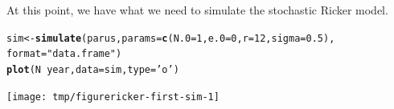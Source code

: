 \documentclass{beamer}\usepackage[]{graphicx}\usepackage[]{color}
\makeatletter
\newcommand{\hlnum}[1]{\textcolor[rgb]{0.686,0.059,0.569}{#1}}%
\newcommand{\hlstr}[1]{\textcolor[rgb]{0.192,0.494,0.8}{#1}}%
\newcommand{\hlopt}[1]{\textcolor[rgb]{0,0,0}{#1}}%
\newcommand{\hlstd}[1]{\textcolor[rgb]{0.345,0.345,0.345}{#1}}%
\newcommand{\hlkwb}[1]{\textcolor[rgb]{0.69,0.353,0.396}{#1}}%
\newcommand{\hlkwc}[1]{\textcolor[rgb]{0.333,0.667,0.333}{#1}}%
\newcommand{\hlkwd}[1]{\textcolor[rgb]{0.737,0.353,0.396}{\textbf{#1}}}%
\newenvironment{kframe}{%
 \def\at@end@of@kframe{}%
 \ifinner\ifhmode%
  \def\at@end@of@kframe{\end{minipage}}%
  \begin{minipage}{\columnwidth}%
 \fi\fi%
 \def\FrameCommand##1{\hskip\@totalleftmargin \hskip-\fboxsep
 \colorbox{shadecolor}{##1}\hskip-\fboxsep
     \hskip-\linewidth \hskip-\@totalleftmargin \hskip\columnwidth}%
 \MakeFramed {\advance\hsize-\width
   \@totalleftmargin\z@ \linewidth\hsize
   \@setminipage}}%
 {\par\unskip\endMakeFramed%
 \at@end@of@kframe}
\newenvironment{knitrout}{}{} %
\makeatother
\begin{document}
\begin{frame}[fragile]
\bi
\item At this point, we have what we need to simulate the stochastic Ricker model.
\ei
\begin{knitrout}\small
{}\color{fgcolor}\begin{kframe}
\begin{alltt}
\hlstd{sim} \hlkwb{<-} \hlkwd{simulate}\hlstd{(parus,}\hlkwc{params}\hlstd{=}\hlkwd{c}\hlstd{(}\hlkwc{N.0}\hlstd{=}\hlnum{1}\hlstd{,}\hlkwc{e.0}\hlstd{=}\hlnum{0}\hlstd{,}\hlkwc{r}\hlstd{=}\hlnum{12}\hlstd{,}\hlkwc{sigma}\hlstd{=}\hlnum{0.5}\hlstd{),}
                \hlkwc{format}\hlstd{=}\hlstr{"data.frame"}\hlstd{)}
\hlkwd{plot}\hlstd{(N}\hlopt{~}\hlstd{year,}\hlkwc{data}\hlstd{=sim,}\hlkwc{type}\hlstd{=}\hlstr{'o'}\hlstd{)}
\end{alltt}
\end{kframe}
\end{knitrout}
\begin{knitrout}\small
{}\color{fgcolor}

{\centering \texttt{[image: tmp/figurericker-first-sim-1]} 

}



\end{knitrout}

\end{frame}
\end{document}
